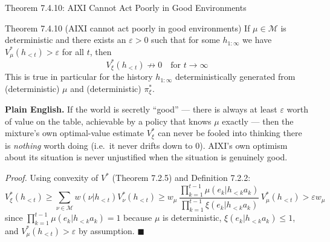 \documentclass[aspectratio=169,10pt]{beamer}
\newcommand{\Mcal}{\mathcal{M}}
\begin{document}
\begin{frame}[allowframebreaks]{Theorem 7.4.10: AIXI Cannot Act Poorly in Good Environments}
  \begin{block}{Theorem 7.4.10 (AIXI cannot act poorly in good environments)}
    If $\mu\in\Mcal$ is deterministic and there exists an $\varepsilon>0$
    such that for some $h_{1:\infty}$ we have $V_\mu^*(h_{<t})>\varepsilon$
    for all $t$, then
    \[
      V_\xi^*(h_{<t}) \not\to 0 \quad\text{for } t\to\infty
    \]
    This is true in particular for the history $h_{1:\infty}$
    deterministically generated from (deterministic) $\mu$ and
    (deterministic) $\pi_\xi^*$.
  \end{block}
  \textbf{Plain English.} If the world is secretly ``good'' --- there is
  always at least $\varepsilon$ worth of value on the table, achievable by
  a policy that knows $\mu$ exactly --- then the mixture's own optimal-value
  estimate $V_\xi^*$ can never be fooled into thinking there is
  \emph{nothing} worth doing (i.e.\ it never drifts down to 0). AIXI's own
  optimism about its situation is never unjustified when the situation is
  genuinely good.

  \vspace{2mm}
  \textit{Proof.} Using convexity of $V^*$ (Theorem 7.2.5) and Definition
  7.2.2:
  \[
    V_\xi^*(h_{<t}) \ge \sum_{\nu\in\Mcal}w(\nu|h_{<t})V_\nu^*(h_{<t})
    \ge w_\mu\,\frac{\prod_{k=1}^{t-1}\mu(e_k|h_{<k}a_k)}
    {\prod_{k=1}^{t-1}\xi(e_k|h_{<k}a_k)}\,V_\mu^*(h_{<t}) > \varepsilon w_\mu
  \]
  since $\prod_{k=1}^{t-1}\mu(e_k|h_{<k}a_k)=1$ because $\mu$ is
  deterministic, $\xi(e_k|h_{<k}a_k)\le1$, and $V_\mu^*(h_{<t})>\varepsilon$
  by assumption. $\blacksquare$
\end{frame}
\end{document}

